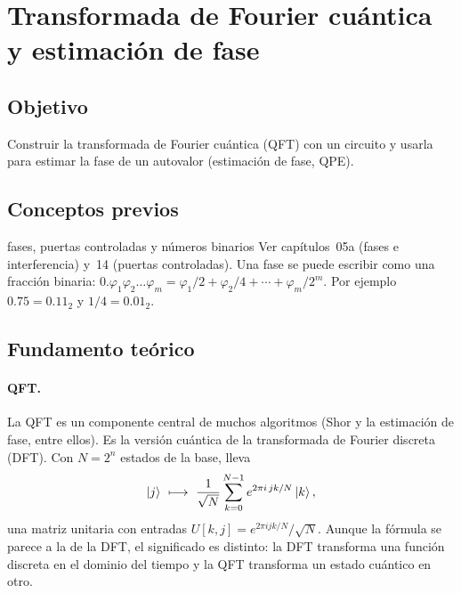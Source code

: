 \def\tituloconcepto{QFT y estimación de fase}


\section{Transformada de Fourier cuántica y estimación de fase}

\subsection{Objetivo}
Construir la transformada de Fourier cuántica (QFT) con un circuito y usarla
para estimar la fase de un autovalor (estimación de fase, QPE).

\subsection{Conceptos previos}
\begin{concepto}{fases, puertas controladas y números binarios}
Ver capítulos~05a (fases e interferencia) y~14 (puertas controladas).
Una fase se puede escribir como una fracción binaria:
$0.\varphi_1\varphi_2\ldots\varphi_m=\varphi_1/2+\varphi_2/4+\cdots+\varphi_m/2^m$.
Por ejemplo $0.75=0.11_2$ y $1/4=0.01_2$.
\end{concepto}

\subsection{Fundamento teórico}
\paragraph{QFT.} La QFT es un componente central de muchos algoritmos (Shor y la
estimación de fase, entre ellos). Es la versión cuántica de la transformada de
Fourier discreta (DFT). Con $N=2^n$ estados de la base, lleva
\begin{equation}
  \ket j\ \longmapsto\ \frac1{\sqrt N}\sum_{k=0}^{N-1}e^{2\pi i\,jk/N}\ket k ,
\end{equation}
una matriz unitaria con entradas $U[k,j]=e^{2\pi ijk/N}/\sqrt N$. Aunque la
fórmula se parece a la de la DFT, el significado es distinto: la DFT transforma
una función discreta en el dominio del tiempo y la QFT transforma un estado
cuántico en otro.


